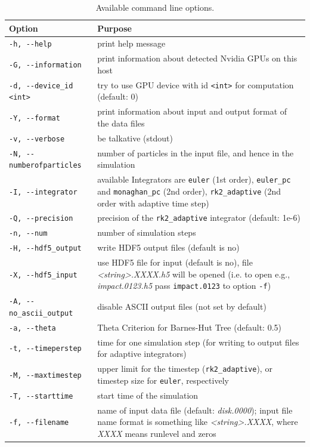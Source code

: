 \documentclass[10pt,fleqn,twoside]{article}
\begin{document}
\begin{table}
\centering
\caption{Available command line options.}
\begin{tabular}[b]{p{5cm} p{9cm}}
\hline
Option	&	Purpose		\\
\hline
\verb|-h, --help|			&	print help message	\\
\verb|-G, --information|	&	print information about detected Nvidia GPUs on this host	\\
\verb|-d, --device_id <int>|	&	try to use GPU device with id \verb|<int>| for computation (default: 0)	\\
\verb|-Y, --format|	&	print information about input and output format of the data files	\\
\verb|-v, --verbose|	&	be talkative (stdout)	\\
\verb|-N, --numberofparticles|		&	number of particles in the input file, and hence in the simulation	\\
\verb|-I, --integrator|	&	available Integrators are \verb|euler| (1st order), \verb|euler_pc| and \verb|monaghan_pc| (2nd order), \verb|rk2_adaptive| (2nd order with adaptive time step)	\\
\verb|-Q, --precision|		&	precision of the \verb|rk2_adaptive| integrator (default: 1e-6)	\\
\verb|-n, --num|	&	number of simulation steps	\\
\verb|-H, --hdf5_output|	&	write HDF5 output files (default is no)	\\
\verb|-X, --hdf5_input|   	&	use HDF5 file for input (default is no), file \emph{<string>.XXXX.h5} will be opened (i.e. to open e.g., \emph{impact.0123.h5} pass \verb|impact.0123| to option \verb|-f|)	\\
\verb|-A, --no_ascii_output|	&	disable ASCII output files (not set by default)	\\
\verb|-a, --theta|		&	Theta Criterion for Barnes-Hut Tree (default: 0.5)	\\
\verb|-t, --timeperstep|	&	time for one simulation step (for writing to output files for adaptive integrators)		\\
\verb|-M, --maxtimestep|  &		upper limit for the timestep (\verb|rk2_adaptive|), or timestep size for \verb|euler|, respectively	\\
\verb|-T, --starttime|		&	start time of the simulation	\\
\verb|-f, --filename|		&	name of input data file (default: \emph{disk.0000}); input file name format is something like \emph{<string>.XXXX}, where \emph{XXXX} means runlevel and zeros	\\

\end{tabular}
\end{table}
\end{document}
